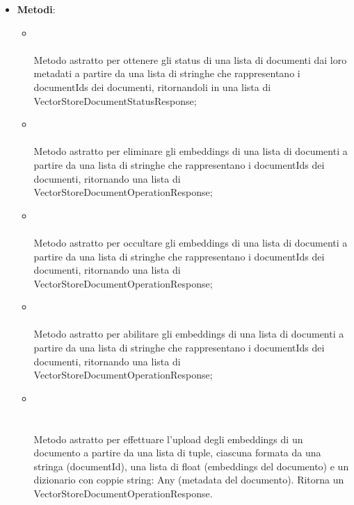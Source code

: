 \documentclass[10pt, a4paper]{article}
\begin{document}
    \label{VectorStoreManagerDettaglio}
    \begin{itemize}
        \item \textbf{Metodi}:
        \begin{itemize}
            \item {}\\ \\
            Metodo astratto per ottenere gli status di una lista di documenti dai loro metadati a partire da una lista di stringhe che rappresentano i documentIds dei documenti, ritornandoli in una lista di VectorStoreDocumentStatusResponse;
            \item {}\\ \\
            Metodo astratto per eliminare gli embeddings di una lista di documenti a partire da una lista di stringhe che rappresentano i documentIds dei documenti, ritornando una lista di VectorStoreDocumentOperationResponse;
            \item {}\\ \\
            Metodo astratto per occultare gli embeddings di una lista di documenti a partire da una lista di stringhe che rappresentano i documentIds dei documenti, ritornando una lista di VectorStoreDocumentOperationResponse;
            \item {}\\ \\
            Metodo astratto per abilitare gli embeddings di una lista di documenti a partire da una lista di stringhe che rappresentano i documentIds dei documenti, ritornando una lista di VectorStoreDocumentOperationResponse;
            \item {}\\ \\ \\
            Metodo astratto per effettuare l'upload degli embeddings di un documento a partire da una lista di tuple, ciascuna formata da una stringa (documentId), una lista di float (embeddings del documento) e un dizionario con coppie string: Any (metadata del documento). Ritorna un VectorStoreDocumentOperationResponse.
        \end{itemize}
    \end{itemize}
    
\end{document}

